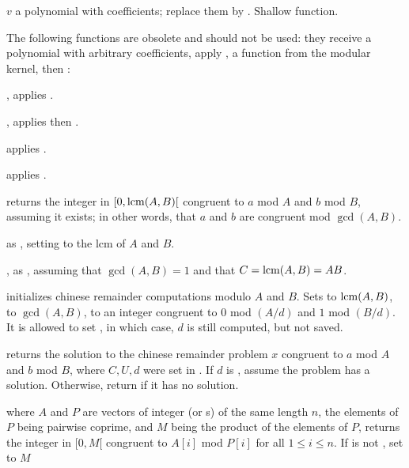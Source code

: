  $v$ a polynomial with 
coefficients; replace them by . Shallow function.

The following functions are obsolete and should not be used: they receive a
polynomial with arbitrary coefficients, apply , a function
from the modular kernel, then :

, applies .

, applies  then
.

 applies .

 applies .


 returns the integer
in $[0, {\rm lcm}(A,B)[$ congruent to $a$ mod $A$ and $b$ mod $B$, assuming it
exists; in other words, that $a$ and $b$ are congruent mod $\gcd(A,B)$.

 as
, setting  to the lcm of $A$ and $B$.

, as
, assuming that $\gcd(A,B) = 1$ and that $C = {\rm lcm}(A,B) = AB$.

initializes chinese remainder computations modulo $A$ and $B$. Sets
 to ${\rm lcm}(A,B)$,  to $\gcd(A,B)$,
 to an integer congruent to $0$ mod $(A/d)$ and $1$ mod $(B/d)$.
It is allowed to set , in which case, $d$ is still
computed, but not saved.

 returns
the solution to the chinese remainder problem $x$ congruent
to $a$ mod $A$ and $b$ mod $B$, where $C, U, d$ were set in
. If $d$ is , assume the problem has a
solution. Otherwise, return  if it has no solution.

\medskip

where $A$ and $P$ are vectors of integer (or s) of the same
length $n$, the elements of $P$ being pairwise coprime, and $M$ being the
product of the elements of $P$, returns the integer in $[0, M[$ congruent to
$A[i]$ mod $P[i]$ for all $1\leq i\leq n$.  If  is not ,
set  to $M$

